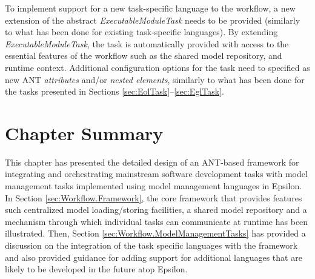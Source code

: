 To implement support for a new task-specific language to the workflow, a new extension of the abstract \emph{ExecutableModuleTask} needs to be provided (similarly to what has been done for existing task-specific languages). By extending \emph{ExecutableModuleTask}, the task is automatically provided with access to the essential features of the workflow such as the shared model repository, and runtime context. Additional configuration options for the task need to specified as new ANT \emph{attributes} and/or \emph{nested elements}, similarly to what has been done for the tasks presented in Sections \ref{sec:EolTask}--\ref{sec:EglTask}.

\section{Chapter Summary}

This chapter has presented the detailed design of an ANT-based framework for integrating and orchestrating mainstream software development tasks with model management tasks implemented using model management languages in Epsilon. In Section \ref{sec:Workflow.Framework}, the core framework that provides features such centralized model loading/storing facilities, a shared model repository and a mechanism through which individual tasks can communicate at runtime has been illustrated. Then, Section \ref{sec:Workflow.ModelManagementTasks} has provided a discussion on the integration of the task specific languages with the framework and also provided guidance for adding support for additional languages that are likely to be developed in the future atop Epsilon.